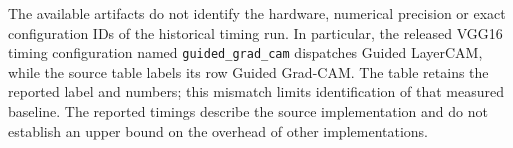 The available artifacts do not identify the hardware, numerical precision or exact configuration IDs of the historical timing run. In particular, the released VGG16 timing configuration named \texttt{guided\_grad\_cam} dispatches Guided LayerCAM, while the source table labels its row Guided Grad-CAM. The table retains the reported label and numbers; this mismatch limits identification of that measured baseline. The reported timings describe the source implementation and do not establish an upper bound on the overhead of other implementations.



